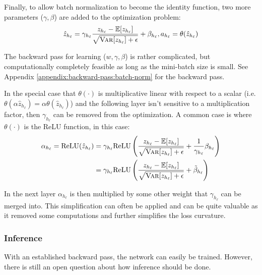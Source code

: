Finally, to allow batch normalization to become the identity function, two more parameters ($\gamma, \beta$) are added to the optimization problem:
\begin{equation}
\hat{z}_{h_\ell} = \gamma_{h_\ell} \frac{z_{h_\ell} - \mathbb{E}[z_{h_\ell}]}{\sqrt{\textsc{Var}[z_{h_\ell}] + \epsilon}} + \beta_{h_\ell}, a_{h_\ell} = \theta(\hat{z}_{h_\ell})
\label{eq:theory:convergence:batch-norm}
\end{equation}

The backward pass for learning ($w, \gamma, \beta$) is rather complicated, but computationally completely feasible as long as the mini-batch size is small. See Appendix \ref{appendix:backward-pass:batch-norm} for the backward pass.

In the special case that $\theta(\cdot)$ is multiplicative linear with respect to a scalar (i.e. $\theta(\alpha \hat{z}_{h_\ell}) = \alpha \theta(\hat{z}_{h_\ell})$) and the following layer isn't sensitive to a multiplication factor, then $\gamma_{h_\ell}$ can be removed from the optimization. A common case is where $\theta(\cdot)$ is the ReLU function, in this case:
\begin{equation}
\begin{aligned}
\alpha_{h_\ell} = \mathrm{ReLU}(\hat{z}_{h_\ell}) &= \gamma_{h_\ell} \mathrm{ReLU}\left(\frac{z_{h_\ell} - \mathbb{E}[z_{h_\ell}]}{\sqrt{\textsc{Var}[z_{h_\ell}] + \epsilon}} +  \frac{1}{\gamma_{h_\ell}}\beta_{h_\ell}\right)\\
&= \gamma_{h_\ell} \mathrm{ReLU}\left(\frac{z_{h_\ell} - \mathbb{E}[z_{h_\ell}]}{\sqrt{\textsc{Var}[z_{h_\ell}] + \epsilon}} +  \tilde{\beta}_{h_\ell}\right)
\end{aligned}
\end{equation}

In the next layer $\alpha_{h_\ell}$ is then multiplied by some other weight that $\gamma_{h_\ell}$ can be merged into. This simplification can often be applied and can be quite valuable as it removed some computations and further simplifies the loss curvature.

\subsubsection{Inference}

With an established backward pass, the network can easily be trained. However, there is still an open question about how inference should be done.

